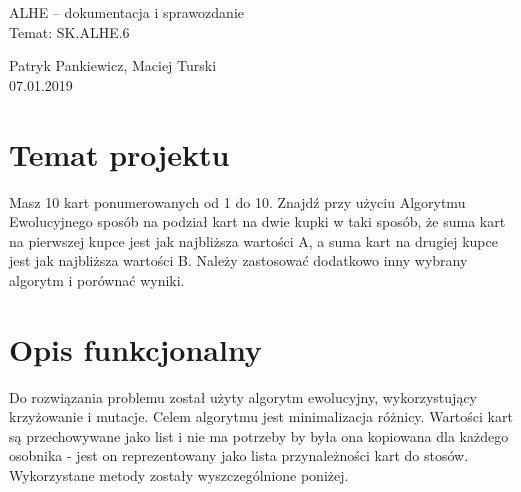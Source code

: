 \documentclass[12pt]{article}
\begin{document}
\begin{center}
\huge
ALHE -- dokumentacja i sprawozdanie\\
Temat: SK.ALHE.6 \\

\bigskip

\LARGE
Patryk Pankiewicz, Maciej Turski \\
07.01.2019 
\end{center}

\newpage

\section{Temat projektu}

Masz 10 kart ponumerowanych od 1 do 10. Znajdź przy użyciu Algorytmu Ewolucyjnego sposób na podział kart na dwie kupki w taki sposób, że suma kart na pierwszej kupce jest jak najbliższa wartości A, a suma kart na drugiej kupce jest jak najbliższa wartości B. Należy zastosować dodatkowo inny wybrany algorytm i porównać wyniki.

\section{Opis funkcjonalny}
Do rozwiązania problemu został użyty algorytm ewolucyjny, wykorzystujący krzyżowanie i mutacje. Celem algorytmu jest minimalizacja różnicy. Wartości kart są przechowywane jako list i nie ma potrzeby by była ona kopiowana dla każdego osobnika - jest on reprezentowany jako lista przynależności kart do stosów. Wykorzystane metody zostały wyszczególnione poniżej. 
\end{document}
